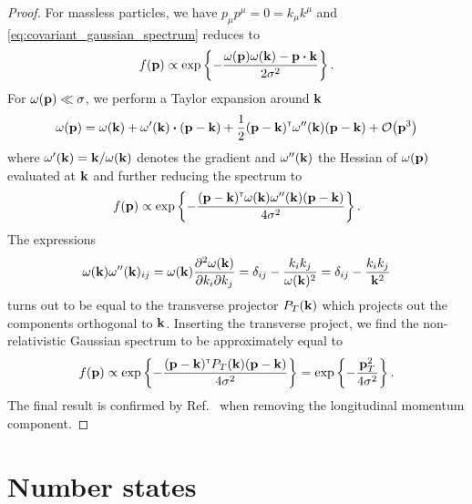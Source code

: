\nonrelativisticgaussianmom
\begin{proof}
	For massless particles, we have $p_\mu p^\mu=0=k_\mu k^\mu$ and \cref{eq:covariant_gaussian_spectrum} reduces to
	\begin{equation*}
		f(\vb{p})
		\propto
		\exp\left\{
			-
			\frac{\omega(\vb{p})\omega(\vb{k})-\vb{p}\vdot\vb{k}}{2\sigma^2}
		\right\}
		.
	\end{equation*}
	For $\omega(\vb{p})\ll\sigma$, we perform a Taylor expansion around $\vb{k}$
	\begin{equation*}
		\omega(\vb{p})
		=
		\omega(\vb{k})
		+
		\omega^\prime(\vb{k})
		\vdot
		(\vb{p}-\vb{k})
		+
		\frac{1}{2}
		(\vb{p}-\vb{k})^\trans
		\omega^{\prime\prime}(\vb{k})
		(\vb{p}-\vb{k})
		+
		\order{\vb{p}^3}
	\end{equation*}
	where $\omega^\prime(\vb{k})=\vb{k}/\omega(\vb{k})$ denotes the gradient and $\omega^{\prime\prime}(\vb{k})$ the Hessian of $\omega(\vb{p})$ evaluated at $\vb{k}$ and further reducing the spectrum to
	\begin{equation*}
		f(\vb{p})
		\propto
		\exp\left\{
			-
			\frac{
				(\vb{p}-\vb{k})^{\scriptscriptstyle\mathsf{T}}
				\omega(\vb{k})
				\omega^{\prime\prime}(\vb{k})
				(\vb{p}-\vb{k})
			}{4\sigma^2}
		\right\}
		.
	\end{equation*}
	The expressions
	\begin{equation*}
		\omega(\vb{k})
		\omega^{\prime\prime}(\vb{k})_{ij}
		=
		\omega(\vb{k})
		\pdv{\omega(\vb{k})}{k_i}{k_j}
		=
		\delta_{ij}
		-
		\frac{k_ik_j}{\omega(\vb{k})^2}
		=
		\delta_{ij}
		-
		\frac{k_ik_j}{\vb{k}^2}
	\end{equation*}
	turns out to be equal to the transverse projector $P_T(\vb{k})$ which projects out the components orthogonal to $\vb{k}$.
	Inserting the transverse project, we find the non-relativistic Gaussian spectrum to be approximately equal to
	\begin{equation*}
		f(\vb{p})
		\propto
		\exp\left\{
			-
			\frac{
				(\vb{p}-\vb{k})^{\scriptscriptstyle\mathsf{T}}
				P_T(\vb{k})
				(\vb{p}-\vb{k})
			}{4\sigma^2}
		\right\}
		=
		\exp\left\{
			-
			\frac{
				\vb{p}_T^2
			}{4\sigma^2}
		\right\}
		.
	\end{equation*}
	The final result is confirmed by Ref.~\cite[eq.~(25)]{Naumov2013} when removing the longitudinal momentum component.
\end{proof}

\section{Number states}

